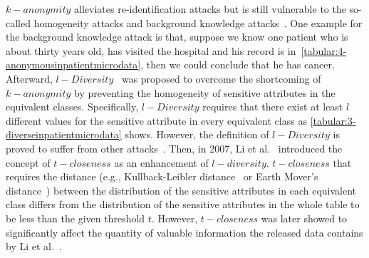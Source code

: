 $k-anonymity$ alleviates re-identification attacks but is still vulnerable to the so-called homogeneity attacks and background knowledge attacks~\cite{machanavajjhala2007diversity}. One example for the background knowledge attack is that, suppose we know one patient who is about thirty years old, has visited the hospital and his record is in~\autoref{tabular:4-anonymousinpatientmicrodata}, then we could conclude that he has cancer. Afterward, $l-Diversity$~\cite{machanavajjhala2007diversity} was proposed to overcome the shortcoming of $k-anonymity$ by preventing the homogeneity of sensitive attributes in the equivalent classes. Specifically, $l-Diversity$ requires that there exist at least $l$ different values for the sensitive attribute in every equivalent class as \autoref{tabular:3-diverseinpatientmicrodata} shows. However, the definition of $l-Diversity$ is proved to suffer from other attacks~\cite{li2007t}. Then, in 2007, Li et al.~\cite{li2007t} introduced the concept of $t-closeness$ as an enhancement of $l-diversity$. $t-closeness$ that requires the distance (e.g., Kullback-Leibler distance~\cite{kullback1951information} or Earth Mover's distance~\cite{rubner2000earth}) between the distribution of the sensitive attributes in each equivalent class differs from the distribution of the sensitive attributes in the whole table to be less than the given threshold $t$. However, $t-closeness$ was later showed to significantly affect the quantity of valuable information the released data contains by Li et al.~\cite{li2009closeness}.

